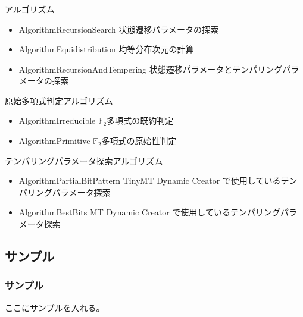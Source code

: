 \documentclass[cjk, dvips, handout, trans, xcolor=dvipsnames]{beamer}
\def\F2{{\mathbb F}_2}
\begin{document}
\begin{frame}[t]
  \frametitle{\insertsubsection}

  アルゴリズム
  \begin{itemize}
  \item AlgorithmRecursionSearch 状態遷移パラメータの探索
  \item AlgorithmEquidistribution 均等分布次元の計算
  \item AlgorithmRecursionAndTempering 状態遷移パラメータとテンパリングパラメータの探索
  \end{itemize}

  \pause
  原始多項式判定アルゴリズム
  \begin{itemize}
  \item AlgorithmIrreducible $\F2$多項式の既約判定
  \item AlgorithmPrimitive $\F2$多項式の原始性判定
  \end{itemize}
  \pause
  テンパリングパラメータ探索アルゴリズム
  \begin{itemize}
  \item AlgorithmPartialBitPattern TinyMT Dynamic Creator で使用しているテンパリングパラメータ探索
  \item AlgorithmBestBits MT Dynamic Creator で使用しているテンパリングパラメータ探索
  \end{itemize}
\end{frame}

\subsection{サンプル}
\begin{frame}[t]
  \frametitle{サンプル}

  ここにサンプルを入れる。
\end{frame}

\end{document}
